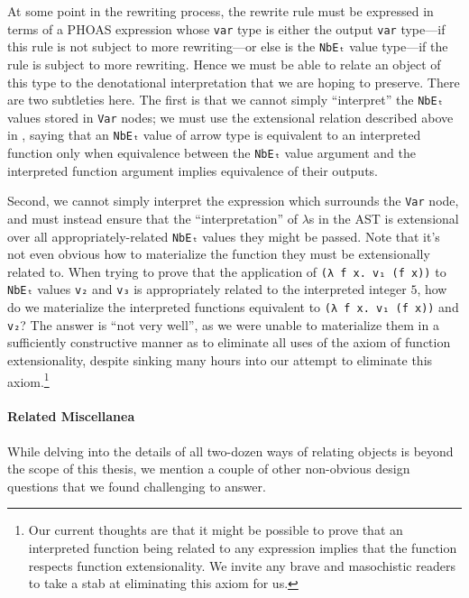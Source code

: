 At some point in the rewriting process, the rewrite rule must be expressed in terms of a PHOAS expression whose \texttt{var} type is either the output \texttt{var} type---if this rule is not subject to more rewriting---or else is the \texttt{NbEₜ} value type---if the rule is subject to more rewriting.
Hence we must be able to relate an object of this type to the denotational interpretation that we are hoping to preserve.
There are two subtleties here.
The first is that we cannot simply ``interpret'' the \texttt{NbEₜ} values stored in \texttt{Var} nodes; we must use the extensional relation described above in , saying that an \texttt{NbEₜ} value of arrow type is equivalent to an interpreted function only when equivalence between the \texttt{NbEₜ} value argument and the interpreted function argument implies equivalence of their outputs.

Second, we cannot simply interpret the expression which surrounds the \texttt{Var} node, and must instead ensure that the ``interpretation'' of $\lambda$s in the AST is extensional over all appropriately-related \texttt{NbEₜ} values they might be passed.
Note that it's not even obvious how to materialize the function they must be extensionally related to.
When trying to prove that the application of \texttt{(λ f x. v₁ (f x))} to \texttt{NbEₜ} values \texttt{v₂} and \texttt{v₃} is appropriately related to the interpreted integer $5$, how do we materialize the interpreted functions equivalent to \texttt{(λ f x. v₁ (f x))} and \texttt{v₂}?
The answer is ``not very well'', as we were unable to materialize them in a sufficiently constructive manner as to eliminate all uses of the axiom of function extensionality, despite sinking many hours into our attempt to eliminate this axiom.\footnote{%
  Our current thoughts are that it might be possible to prove that an interpreted function being related to any expression implies that the function respects function extensionality.
  We invite any brave and masochistic readers to take a stab at eliminating this axiom for us.%
}

\paragraph{Related Miscellanea}
While delving into the details of all two-dozen ways of relating objects is beyond the scope of this thesis, we mention a couple of other non-obvious design questions that we found challenging to answer.

